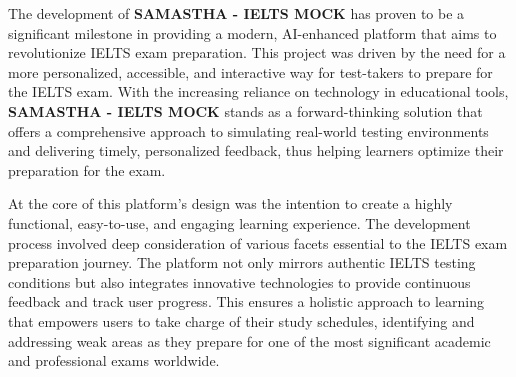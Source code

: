 \documentclass[a4paper,12pt]{article}
\begin{document}
\vspace{0.5cm}

The development of \textbf{SAMASTHA - IELTS MOCK} has proven to be a significant milestone in providing a modern, AI-enhanced platform that aims to revolutionize IELTS exam preparation. This project was driven by the need for a more personalized, accessible, and interactive way for test-takers to prepare for the IELTS exam. With the increasing reliance on technology in educational tools, \textbf{SAMASTHA - IELTS MOCK} stands as a forward-thinking solution that offers a comprehensive approach to simulating real-world testing environments and delivering timely, personalized feedback, thus helping learners optimize their preparation for the exam.

\vspace{0.3cm}

At the core of this platform's design was the intention to create a highly functional, easy-to-use, and engaging learning experience. The development process involved deep consideration of various facets essential to the IELTS exam preparation journey. The platform not only mirrors authentic IELTS testing conditions but also integrates innovative technologies to provide continuous feedback and track user progress. This ensures a holistic approach to learning that empowers users to take charge of their study schedules, identifying and addressing weak areas as they prepare for one of the most significant academic and professional exams worldwide.

\vspace{0.3cm}
\end{document}
